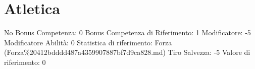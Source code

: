 \section{Atletica}\label{atletica}

\begin{description}
\tightlist
\item[Tags: ABI]
No Bonus Competenza: 0 Bonus Competenza di Riferimento: 1 Modificatore:
-5 Modificatore Abilità: 0 Statistica di riferimento: Forza
(Forza\%20412bdddd487a4359907887bf7d9ca828.md) Tiro Salvezza: -5 Valore
di riferimento: 0
\end{description}
